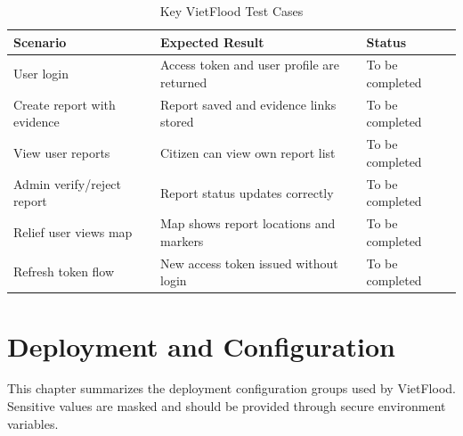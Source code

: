 \begin{table}[H]
\centering
\caption{Key VietFlood Test Cases}
\label{tab:appendix-test-cases}
\renewcommand{\arraystretch}{1.15}
\small
\begin{tabularx}{\textwidth}{|p{3.2cm}|X|p{2.8cm}|}
\hline
\textbf{Scenario} & \textbf{Expected Result} & \textbf{Status} \\
\hline
User login & Access token and user profile are returned & To be completed \\
\hline
Create report with evidence & Report saved and evidence links stored & To be completed \\
\hline
View user reports & Citizen can view own report list & To be completed \\
\hline
Admin verify/reject report & Report status updates correctly & To be completed \\
\hline
Relief user views map & Map shows report locations and markers & To be completed \\
\hline
Refresh token flow & New access token issued without login & To be completed \\
\hline
\end{tabularx}
\end{table}

\chapter{Deployment and Configuration}

This chapter summarizes the deployment configuration groups used by VietFlood. Sensitive values are masked and should be provided through secure environment variables.

